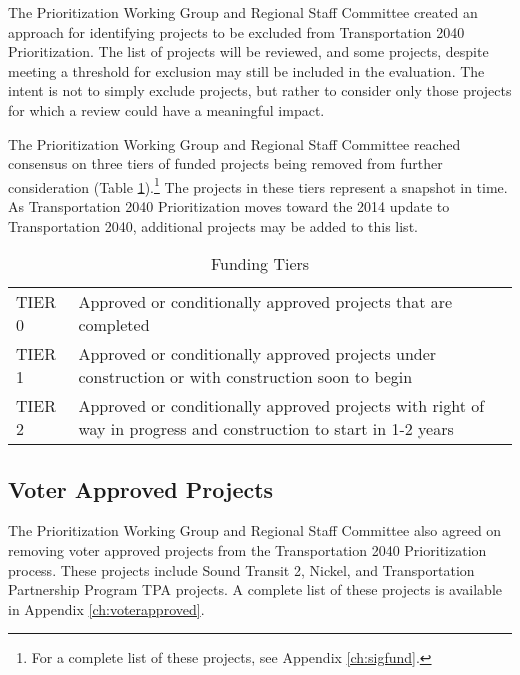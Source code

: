 \documentclass[10pt, letterpaper, final, twoside, onecolumn]{memoir}%
\begin{document}
The Prioritization Working Group and Regional Staff Committee created an approach for identifying projects to be excluded from Transportation 2040 Prioritization. The list of projects will be reviewed, and some projects, despite meeting a threshold for exclusion may still be included in the evaluation. The intent is not to simply exclude projects, but rather to consider only those projects for which a review could have a meaningful impact.

The Prioritization Working Group and Regional Staff Committee reached consensus on three tiers of funded projects being removed from further consideration (Table \ref{tb:fundtier}).\footnote{For a complete list of these projects, see Appendix \ref{ch:sigfund}.} The projects in these tiers represent a snapshot in time. As Transportation 2040 Prioritization moves toward the 2014 update to Transportation 2040, additional projects may be added to this list. 
 
\begin{table}[htdp]
\caption{Funding Tiers}
\begin{center}
\begin{tabularx}{0.6\textwidth}{>{\raggedright\arraybackslash}p{3pc}>{\raggedright\arraybackslash}X}
\toprule
TIER 0	&	Approved or conditionally approved projects that are completed \\
TIER 1	&	Approved or conditionally approved projects under construction or with construction soon to begin \\
TIER 2	&	Approved or conditionally approved projects with right of way in progress and construction to start in 1-2 years \\
\bottomrule
\end{tabularx}
\end{center}
\label{tb:fundtier}
\end{table}%
 
 
\subsection{Voter Approved Projects}

The Prioritization Working Group and Regional Staff Committee also agreed on removing voter approved projects from the Transportation 2040 Prioritization process. These projects include Sound Transit 2, Nickel, and Transportation Partnership Program TPA projects. A complete list of these projects is available in Appendix \ref{ch:voterapproved}.
\end{document}
